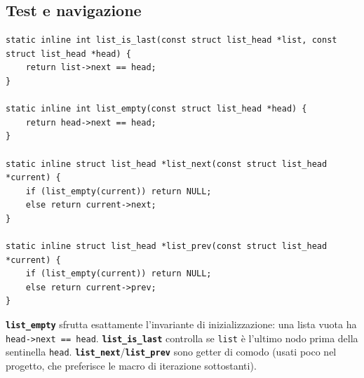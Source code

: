 \documentclass[11pt,a4paper]{article}
\newcommand{\code}[1]{\texttt{#1}}
\newcommand{\func}[1]{\textbf{\texttt{#1}}}
\begin{document}
\subsection{Test e navigazione}
\begin{lstlisting}
static inline int list_is_last(const struct list_head *list, const struct list_head *head) {
    return list->next == head;
}

static inline int list_empty(const struct list_head *head) {
    return head->next == head;
}

static inline struct list_head *list_next(const struct list_head *current) {
    if (list_empty(current)) return NULL;
    else return current->next;
}

static inline struct list_head *list_prev(const struct list_head *current) {
    if (list_empty(current)) return NULL;
    else return current->prev;
}
\end{lstlisting}
\func{list\_empty} sfrutta esattamente l'invariante di inizializzazione: una
lista vuota ha \code{head->next == head}. \func{list\_is\_last} controlla se
\code{list} è l'ultimo nodo prima della sentinella \code{head}.
\func{list\_next}/\func{list\_prev} sono getter di comodo (usati poco nel
progetto, che preferisce le macro di iterazione sottostanti).
\end{document}
